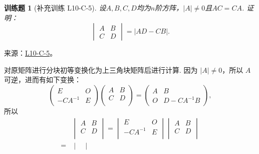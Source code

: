 \documentclass[UTF8,12pt,a4paper,fontset=fandol]{ctexart}
\newtheorem{exercise}{训练题}[section]
\begin{document}
\begin{exercise}[补充训练 L10-C-5]\label{prob:L10-C-5}
设$A,B,C,D$均为$n$阶方阵，$\lvert A \rvert \neq 0$且$AC=CA$. 证明：
        \[\begin{vmatrix}
                A & B \\ C & D
            \end{vmatrix} = |AD-CB|.\]
\end{exercise}
\noindent 来源：\href{https://github.com/yhwu-is/Linear-Algebra-Left-Undone/blob/new/%E8%AE%B2%E4%B9%89/%E4%B8%93%E9%A2%98/10%20%E8%A1%8C%E5%88%97%E5%BC%8F.tex}{L10-C-5}。
\begin{solve}
对原矩阵进行分块初等变换化为上三角块矩阵后进行计算. 因为 $\lvert A \rvert \neq 0$，所以 $A$ 可逆，进而有如下变换：
            \[\begin{pmatrix}
                    E        & O \\
                    -CA^{-1} & E
                \end{pmatrix} \begin{pmatrix}
                    A & B \\
                    C & D \\
                \end{pmatrix} = \begin{pmatrix}
                    A & B          \\
                    O & D-CA^{-1}B
                \end{pmatrix},\]
            所以
            \begin{align*}
                    & \begin{vmatrix}
                            A & B \\
                            C & D \\
                        \end{vmatrix}
                = \begin{vmatrix}
                        E        & O \\
                        -CA^{-1} & E \\
                    \end{vmatrix}
                \begin{vmatrix}
                    A & B \\
                    C & D \\
                \end{vmatrix}       \\
                ={} & \begin{vmatrix}

\end{vmatrix}
\end{align*}
\end{solve}
\end{document}
